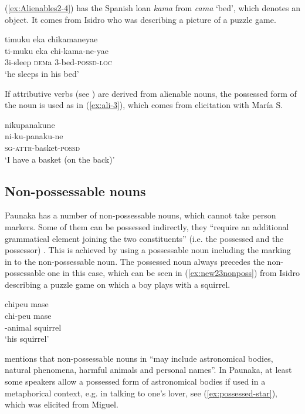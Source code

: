 (\ref{ex:Alienables2-4}) has the Spanish loan \textit{kama} from \textit{cama} ‘bed’, which denotes an object. It comes from Isidro who was describing a picture of a puzzle game.

\ea\label{ex:Alienables2-4}
\begingl 
\glpreamble timuku eka chikamaneyae\\
\gla ti-muku eka chi-kama-ne-yae\\ 
\glb 3i-sleep \textsc{dem}a 3-bed-\textsc{possd}-\textsc{loc}\\ 
\glft ‘he sleeps in his bed’
\trailingcitation{[dxx-d120416s.002]}
\xe

If attributive verbs (see ) are derived from alienable nouns, the possessed form of the noun is used as in (\ref{ex:ali-3}), which comes from elicitation with María S.

\ea\label{ex:ali-3}
\begingl
\glpreamble nikupanakune\\
\gla ni-ku-panaku-ne\\
\textsc{sg}-\textsc{attr}-basket-\textsc{possd}\\
\glft ‘I have a basket (on the back)’
\endgl
\trailingcitation{[rxx-e181020le]}
\xe
{}
 
\subsection{Non-possessable nouns}\label{sec:Non-possessables}

Paunaka has a number of non-possessable nouns, which cannot take person markers. Some of them can be possessed indirectly, they “require an additional grammatical element joining the two constituents” (i.e. the possessed and the possessor) \citep[58]{Krasnoukhova2012}. This is achieved by using a possessable noun including the  marking in  to the non-possessable noun. The possessed noun always precedes the non-possessable one in this case, which can be seen in (\ref{ex:new23nonposs}) from Isidro describing a puzzle game on which a boy plays with a squirrel. 

\ea\label{ex:new23nonposs}
\begingl
\glpreamble chipeu mase\\
\gla chi-peu mase\\
-animal squirrel\\
\glft ‘his squirrel’
\endgl
\trailingcitation{[mdx-c120416ls.177]}
\xe


\citet[82]{Aikhenvald1999} mentions that non-possessable nouns in  “may include astronomical bodies, natural phenomena, harmful animals and personal names”. %
In Paunaka, at least some speakers allow a possessed form of astronomical bodies if used in a metaphorical context, e.g. in talking to one’s lover, see (\ref{ex:possessed-star}), which was elicited from Miguel.

